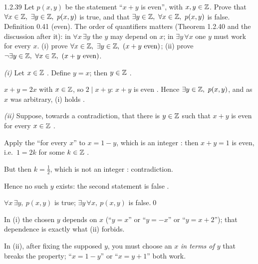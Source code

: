 \begin{bookex}[essential]{1.2.39}
Let $p(x,y)$ be the statement ``$x+y$ is even'', with $x,y\in\mathbb{Z}$. Prove that $\forall x\in\Z,\ \exists y\in\Z,\ p(x,y)$ is true, and that $\exists y\in\mathbb{Z},\ \forall x\in\mathbb{Z},\ p(x,y)$ is false.
\solution
\given Definition 0.41 (even). The order of quantifiers matters (Theorem 1.2.40 and the discussion after it): in $\forall x\,\exists y$ the $y$ may depend on $x$; in $\exists y\,\forall x$ one $y$ must work for every $x$.
\goal (i) prove $\forall x\in\Z,\ \exists y\in\Z,\ (x+y\text{ even})$; (ii) prove $\neg\exists y\in\mathbb{Z},\ \forall x\in\mathbb{Z},\ (x+y\text{ even})$.
\begin{steps}
\item \emph{(i)} Let $x\in\mathbb{Z}$ . Define $y=x$; then $y\in\mathbb{Z}$ .
\item $x+y=2x$ with $x\in\mathbb{Z}$, so $2\mid x+y$: $x+y$ is even . Hence $\exists y\in\Z,\ p(x,y)$, and as $x$ was arbitrary, (i) holds .
\item \emph{(ii)} Suppose, towards a contradiction, that there is $y\in\mathbb{Z}$ such that $x+y$ is even for every $x\in\mathbb{Z}$ .
\item Apply the ``for every $x$'' to $x=1-y$, which is an integer : then $x+y=1$ is even, i.e.\ $1=2k$ for some $k\in\mathbb{Z}$ .
\item But then $k=\frac12$, which is not an integer : contradiction.
\item Hence no such $y$ exists: the second statement is false .
\end{steps}
\conclusion $\forall x\,\exists y,\ p(x,y)$ is true; $\exists y\,\forall x,\ p(x,y)$ is false.\qed
\begin{compare}
\item In (i) the chosen $y$ depends on $x$ (``$y=x$'' or ``$y=-x$'' or ``$y=x+2$''); that dependence is exactly what (ii) forbids.
\item In (ii), after fixing the supposed $y$, you must choose an $x$ \emph{in terms of $y$} that breaks the property; ``$x=1-y$'' or ``$x=y+1$'' both work.
\end{compare}
\end{bookex}


